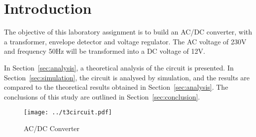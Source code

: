 \section{Introduction}
\label{sec:introduction}

The objective of this laboratory assignment is to build an AC/DC converter, with a transformer, envelope  detector and voltage regulator. The AC voltage of 230V and frequency 50Hz will be transformed into a DC voltage of 12V.

In Section~\ref{sec:analysis}, a theoretical analysis of the circuit is
presented. In Section~\ref{sec:simulation}, the circuit is analysed by
simulation, and the results are compared to the theoretical results obtained in
Section~\ref{sec:analysis}. The conclusions of this study are outlined in
Section~\ref{sec:conclusion}.

\begin{figure}[H] \centering
\texttt{[image: ../t3circuit.pdf]}
\caption{AC/DC Converter}
\label{fig:t3}
\end{figure}


